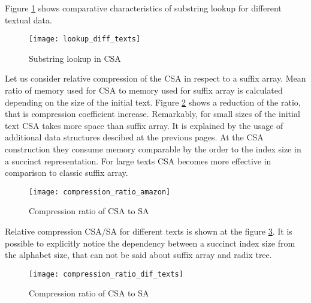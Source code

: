 Figure \ref{fig:CSA_Lookup_diff_texts} shows comparative characteristics of substring lookup
for different textual data.

\begin{figure}[ht!]
    \centering
    \texttt{[image: lookup\_diff\_texts]}
    \caption{Substring lookup in CSA}
    \label{fig:CSA_Lookup_diff_texts}
\end{figure}

Let us consider relative compression of the CSA in respect to a suffix array.
Mean ratio of memory used for CSA to memory used for suffix array is calculated
depending on the size of the initial text. Figure \ref{fig:CSA_compression_ratio_amazon} shows
a reduction of the ratio, that is compression coefficient increase.
Remarkably, for small sizes of the initial text CSA takes more space than suffix array.
It is explained by the usage of additional data structures descibed at the previous pages.
At the CSA construction they consume memory comparable by the order to the index size
in a succinct representation. For large texts CSA becomes more effective in comparison to
classic suffix array.

\begin{figure}[ht!]
    \centering
    \texttt{[image: compression\_ratio\_amazon]}
    \caption{Compression ratio of CSA to SA}
    \label{fig:CSA_compression_ratio_amazon}
\end{figure}

Relative compression CSA/SA for different texts is shown at the figure \ref{fig:CSA_compression_ratio_dif_texts}.
It is possible to explicitly notice the dependency between a succinct index size from the alphabet size,
that can not be said about suffix array and radix tree.

\begin{figure}[ht!]
    \centering
    \texttt{[image: compression\_ratio\_dif\_texts]}
    \caption{Compression ratio of CSA to SA}
    \label{fig:CSA_compression_ratio_dif_texts}
\end{figure}
